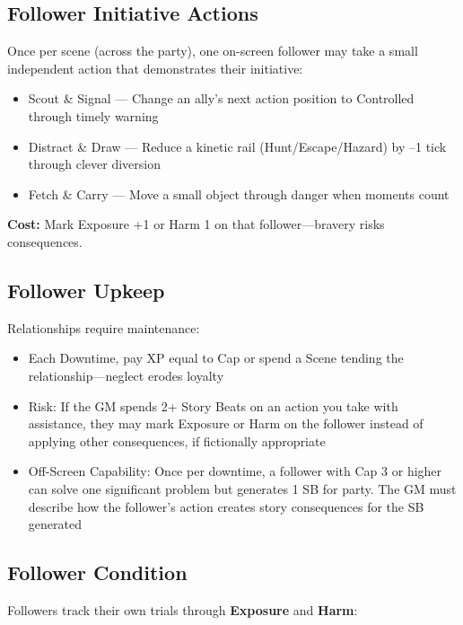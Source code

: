 \subsection*{Follower Initiative Actions}

Once per scene (across the party), one on-screen follower may take a small independent action that demonstrates their initiative:

\begin{itemize}
    \item Scout \& Signal --- Change an ally's next action position to Controlled through timely warning
    \item Distract \& Draw --- Reduce a kinetic rail (Hunt/Escape/Hazard) by –1 tick through clever diversion
    \item Fetch \& Carry --- Move a small object through danger when moments count
\end{itemize}

\textbf{Cost:} Mark Exposure +1 or Harm 1 on that follower—bravery risks consequences.

\subsection*{Follower Upkeep}

Relationships require maintenance:

\begin{itemize}
    \item Each Downtime, pay XP equal to Cap or spend a Scene tending the relationship—neglect erodes loyalty
    \item Risk: If the GM spends 2+ Story Beats on an action you take with assistance, they may mark Exposure or Harm on the follower instead of applying other consequences, if fictionally appropriate
    \item Off-Screen Capability: Once per downtime, a follower with Cap 3 or higher can solve one significant problem but generates 1 SB for party. The GM must describe how the follower's action creates story consequences for the SB generated
\end{itemize}

\subsection*{Follower Condition}

Followers track their own trials through \textbf{Exposure} and \textbf{Harm}:

